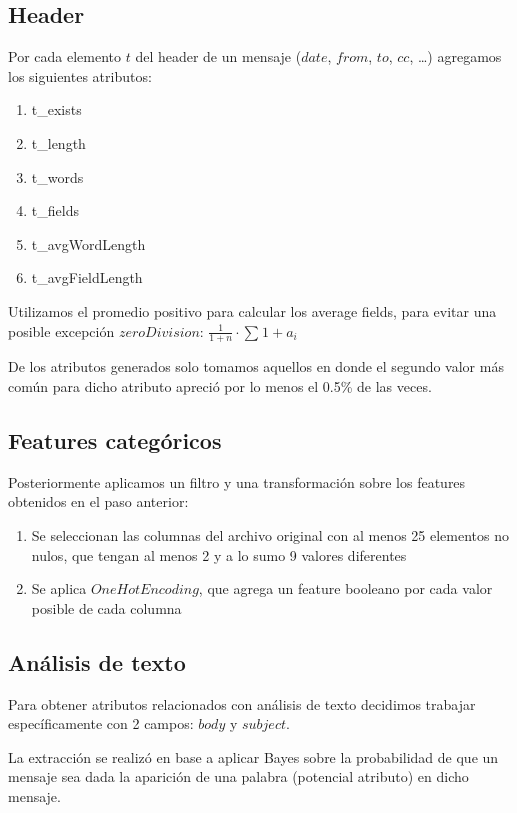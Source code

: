 \subsection{Header}

Por cada elemento \(t\) del header de un mensaje (\(date\), \(from\), \(to\), \(cc\), \ldots) agregamos los siguientes atributos:

\begin{enumerate}
  \item{t\_exists}
  \item{t\_length}
  \item{t\_words}
  \item{t\_fields}
  \item{t\_avgWordLength}
  \item{t\_avgFieldLength}
\end{enumerate}

Utilizamos el promedio positivo para calcular los average fields, para evitar una posible excepción \(zeroDivision\): $\frac{1}{1+n} \cdot \sum_{}^{}1+a_{i}$

De los atributos generados solo tomamos aquellos en donde el segundo valor más común para dicho atributo apreció por lo menos el 0.5\% de las veces.

\subsection{Features categóricos}

Posteriormente aplicamos un filtro y una transformación sobre los features obtenidos en el paso anterior:
\begin{enumerate}
  \item{Se seleccionan las columnas del archivo original con al menos 25 elementos no nulos, que tengan al menos 2 y a lo sumo 9 valores diferentes}
  \item{Se aplica \(OneHotEncoding\), que agrega un feature booleano por cada valor posible de cada columna}
\end{enumerate}

\subsection{Análisis de texto}

Para obtener atributos relacionados con análisis de texto decidimos trabajar específicamente con 2 campos: \(body\) y \(subject\).

La extracción se realizó en base a aplicar Bayes sobre la probabilidad de que un mensaje sea \spam{} dada la aparición de una palabra (potencial atributo) en dicho mensaje.

